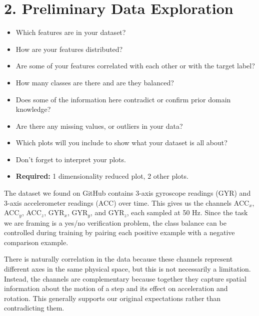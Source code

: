 \documentclass[11pt]{article}
\begin{document}
\section{2. Preliminary Data Exploration}
\begin{itemize}
    \item Which features are in your dataset?
    \item How are your features distributed?
    \item Are some of your features correlated with each other or with the target label?
    \item How many classes are there and are they balanced?
    \item Does some of the information here contradict or confirm prior domain knowledge?
    \item Are there any missing values, or outliers in your data?
    \item Which plots will you include to show what your dataset is all about?
    \item Don't forget to interpret your plots.
    \item \textbf{Required:} 1 dimensionality reduced plot, 2 other plots.
\end{itemize}

The dataset we found on GitHub contains 3-axis gyroscope readings (GYR) and 3-axis accelerometer readings (ACC) over time. This gives us the channels ACC$_x$, ACC$_y$, ACC$_z$, GYR$_x$, GYR$_y$, and GYR$_z$, each sampled at 50 Hz. Since the task we are framing is a yes/no verification problem, the class balance can be controlled during training by pairing each positive example with a negative comparison example.

There is naturally correlation in the data because these channels represent different axes in the same physical space, but this is not necessarily a limitation. Instead, the channels are complementary because together they capture spatial information about the motion of a step and its effect on acceleration and rotation. This generally supports our original expectations rather than contradicting them.
\end{document}
